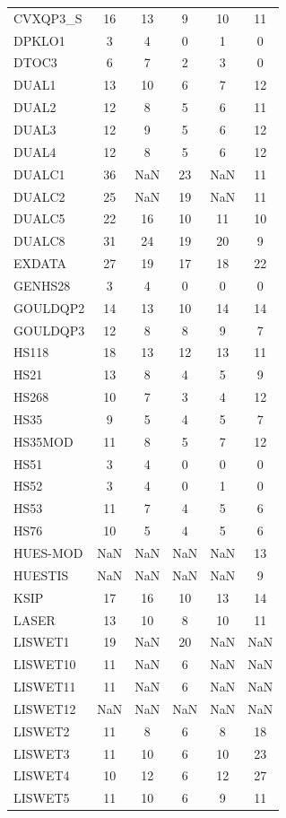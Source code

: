 \begin{longtable}{lccccc}
CVXQP3_S & 16 & 13 & 9 & 10 & 11 \\
DPKLO1 & 3 & 4 & 0 & 1 & 0 \\
DTOC3 & 6 & 7 & 2 & 3 & 0 \\
DUAL1 & 13 & 10 & 6 & 7 & 12 \\
DUAL2 & 12 & 8 & 5 & 6 & 11 \\
DUAL3 & 12 & 9 & 5 & 6 & 12 \\
DUAL4 & 12 & 8 & 5 & 6 & 12 \\
DUALC1 & 36 & NaN & 23 & NaN & 11 \\
DUALC2 & 25 & NaN & 19 & NaN & 11 \\
DUALC5 & 22 & 16 & 10 & 11 & 10 \\
DUALC8 & 31 & 24 & 19 & 20 & 9 \\
EXDATA & 27 & 19 & 17 & 18 & 22 \\
GENHS28 & 3 & 4 & 0 & 0 & 0 \\
GOULDQP2 & 14 & 13 & 10 & 14 & 14 \\
GOULDQP3 & 12 & 8 & 8 & 9 & 7 \\
HS118 & 18 & 13 & 12 & 13 & 11 \\
HS21 & 13 & 8 & 4 & 5 & 9 \\
HS268 & 10 & 7 & 3 & 4 & 12 \\
HS35 & 9 & 5 & 4 & 5 & 7 \\
HS35MOD & 11 & 8 & 5 & 7 & 12 \\
HS51 & 3 & 4 & 0 & 0 & 0 \\
HS52 & 3 & 4 & 0 & 1 & 0 \\
HS53 & 11 & 7 & 4 & 5 & 6 \\
HS76 & 10 & 5 & 4 & 5 & 6 \\
HUES-MOD & NaN & NaN & NaN & NaN & 13 \\
HUESTIS & NaN & NaN & NaN & NaN & 9 \\
KSIP & 17 & 16 & 10 & 13 & 14 \\
LASER & 13 & 10 & 8 & 10 & 11 \\
LISWET1 & 19 & NaN & 20 & NaN & NaN \\
LISWET10 & 11 & NaN & 6 & NaN & NaN \\
LISWET11 & 11 & NaN & 6 & NaN & NaN \\
LISWET12 & NaN & NaN & NaN & NaN & NaN \\
LISWET2 & 11 & 8 & 6 & 8 & 18 \\
LISWET3 & 11 & 10 & 6 & 10 & 23 \\
LISWET4 & 10 & 12 & 6 & 12 & 27 \\
LISWET5 & 11 & 10 & 6 & 9 & 11 \\

\end{longtable}
